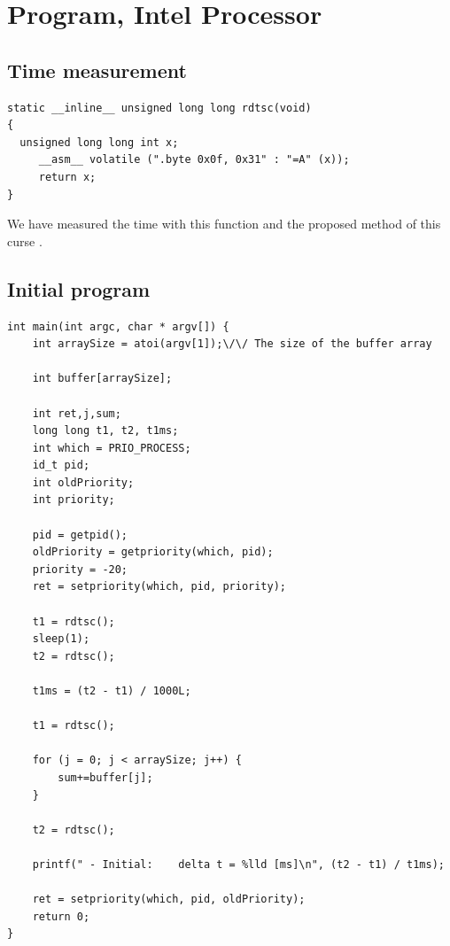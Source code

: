 \documentclass[a4paper,10pt]{article}
\begin{document}
		\section{ Program,  Intel  Processor }
			\subsection{Time measurement}
		\begin{lstlisting} 
static __inline__ unsigned long long rdtsc(void)
{
  unsigned long long int x;
     __asm__ volatile (".byte 0x0f, 0x31" : "=A" (x));
     return x;
}
		\end{lstlisting}
		We have measured the time with this function and the proposed method of this curse . 
		\subsection{Initial program}
				\begin{lstlisting} 
int main(int argc, char * argv[]) {
	int arraySize = atoi(argv[1]);\/\/ The size of the buffer array
	
	int buffer[arraySize];
	
	int ret,j,sum;
	long long t1, t2, t1ms;
	int which = PRIO_PROCESS;
	id_t pid;
	int oldPriority;
	int priority;
	
	pid = getpid();
	oldPriority = getpriority(which, pid);
	priority = -20;
	ret = setpriority(which, pid, priority);
	
	t1 = rdtsc();
	sleep(1);
	t2 = rdtsc();
	
	t1ms = (t2 - t1) / 1000L;
	
	t1 = rdtsc();

	for (j = 0; j < arraySize; j++) {
		sum+=buffer[j];
	}
	
	t2 = rdtsc();
	
	printf(" - Initial:    delta t = %lld [ms]\n", (t2 - t1) / t1ms);
	
	ret = setpriority(which, pid, oldPriority);
	return 0;
}
				\end{lstlisting}
\end{document}
